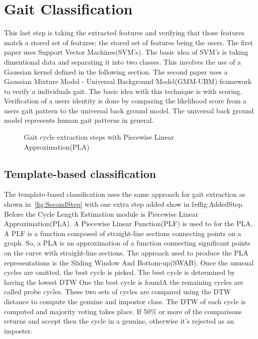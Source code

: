 \documentclass{sig-alternate}
\begin{document}
\section{Gait Classification}
	This last step is taking the extracted features and verifying that those features match a stored set of features; the stored set of features being the users. The first paper uses Support Vector Machines(SVM's). The basic idea of SVM's is taking dimentional data and separating it into two classes. This involves the use of a Gaussian kernel defined in the following section. The second paper uses a Gaussian Mixture Model - Universal Background Model(GMM-UBM) framework to verify a individuals gait. The basic idea with this technique is with scoring. Verification of a users identity is done by comparing the likelihood score from a users gait pattern to the universal back ground model. The universal back ground model represents human gait patterns in general.




\begin{figure}
\centering
{}
\caption{Gait cycle extraction steps with Piecewise Linear Approximation(PLA)}
\label{fig:AddedStep}
\end{figure}

\subsection{Template-based classification}
	The template-based classification uses the same approach for gait extraction as shown in~\ref{fig:SecondStep} with one extra step added show in \~ref{fig:AddedStep}. Before the Cycle Length Estimation module is Piecewise Linear Approximation(PLA). A Piecewise Linear Function(PLF) is used to for the PLA. A PLF is a function composed of straight-line sections connecting points on a graph. So, a PLA is an approximation of a function connecting significant points on the curve with straight-line sections. The approach used to produce the PLA representations is the
Sliding Window And Bottom-up(SWAB). Once the unusual cycles are omitted, the best cycle is picked. The best cycle is determined by having the lowest DTW 
One the best cycle is foundA the remaining cycles are called probe cycles. These two sets of cycles are compared using the DTW distance to compute the genuine and impostor class. The DTW of each cycle is computed and majority voting takes place. If 50\% or more of the comparisons returns and accept then the cycle in a genuine, otherwise it's rejected as an imposter. 
\end{document}
